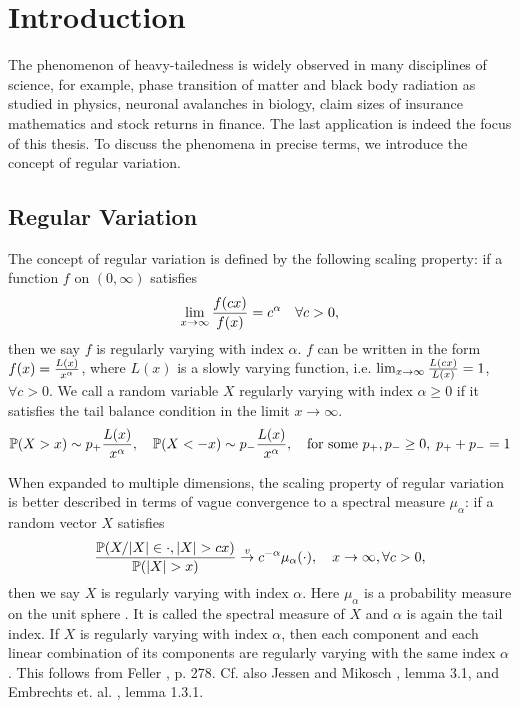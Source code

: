 \chapter{Introduction}\label{ch:intr}
The phenomenon of heavy-tailedness is widely observed in many
disciplines of science, for example, phase transition of matter and
black body radiation as studied in physics, neuronal avalanches in
biology, claim sizes of insurance mathematics and stock returns in
finance. The last application is indeed the focus of this thesis. To
discuss the phenomena in precise terms, we introduce the concept of
regular variation.

\section{Regular Variation}\label{sec:intro_regvar}
The concept of regular variation is defined by the following scaling
property: if a function $f$ on $(0, \infty)$ satisfies
\[
\lim_{x \to \infty} {f(c x) \over f(x)} = c^\alpha
\quad
\forall c > 0,
\]
then we say $f$ is regularly varying with index $\alpha$.
$f$ can be written in the form $f(x) = {L(x) \over x^\alpha}$, where
$L(x)$ is a slowly varying function, i.e.
$\lim_{x \to \infty} {L(c x) \over L(x)} = 1$, $\forall c > 0$.
We call a random variable $X$ regularly varying with index
$\alpha \geq 0$ if it satisfies the tail balance condition in the
limit $x \to \infty$.
\[
\P(X > x) \sim p_+ {L(x) \over x^\alpha},\quad
\P(X < -x) \sim p_- {L(x) \over x^\alpha}, \quad
\text{for some } p_+, p_- \geq 0,\; p_+ + p_- = 1
\]

When expanded to multiple dimensions, the scaling property of regular
variation is better described in terms of vague convergence to a
spectral measure $\mu_\alpha$: if a random vector $X$ satisfies
\[
{
  \P(X/|X| \in \cdot, |X| > c x)
  \over
  \P(|X| > x)
}
\overset{v}{\to} c^{-\alpha} \mu_\alpha(\cdot),
\quad
x \to \infty, \forall c > 0,
\]
then we say $X$ is regularly varying with index $\alpha$. Here
$\mu_\alpha$ is a probability measure on the unit sphere
\cite{buraczewski:damek:mikosch:2016}. It is called the spectral 
measure of $X$ and $\alpha$ is again the tail index.
If $X$ is regularly varying with index $\alpha$, then each component
and each linear combination of its components are regularly
varying with the same index $\alpha$. This follows from Feller
\cite{feller}, p. 278. Cf. also Jessen and Mikosch
\cite{JessenMikosch2006}, lemma 3.1, and Embrechts et. al.
\cite{embrechts:klueppelberg:mikosch:1997}, lemma 1.3.1.

